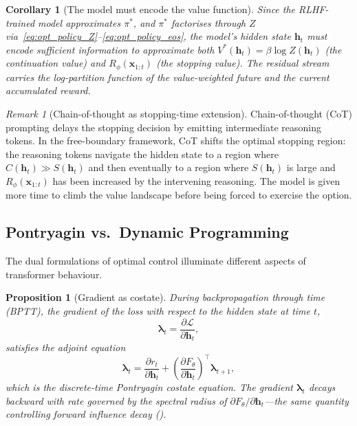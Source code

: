 \documentclass[11pt,a4paper]{article}
\theoremstyle{plain}
\newtheorem{proposition}[theorem]{Proposition}
\newtheorem{corollary}[theorem]{Corollary}
\theoremstyle{definition}
\theoremstyle{remark}
\newtheorem{remark}[theorem]{Remark}
\newcommand{\cL}{\mathcal{L}}
\begin{document}
\begin{corollary}[The model must encode the value function]\label{cor:must_encode}
Since the RLHF-trained model approximates $\pi^*$, and $\pi^*$ factorises
through $Z$ via~\eqref{eq:opt_policy_Z}--\eqref{eq:opt_policy_eos}, the
model's hidden state $\bm{h}_t$ must encode sufficient information to
approximate both $V^*(\bm{h}_t) = \beta \log Z(\bm{h}_t)$ (the
continuation value) and $R_\phi(\bm{x}_{1:t})$ (the stopping value).
The residual stream carries the log-partition function of the
value-weighted future \emph{and} the current accumulated reward.
\end{corollary}

\begin{remark}[Chain-of-thought as stopping-time extension]
Chain-of-thought (CoT) prompting delays the stopping decision by emitting
intermediate reasoning tokens. In the free-boundary framework, CoT
shifts the optimal stopping region: the reasoning tokens navigate the
hidden state to a region where $C(\bm{h}_t) \gg S(\bm{h}_t)$ and then
eventually to a region where $S(\bm{h}_t)$ is large and
$R_\phi(\bm{x}_{1:t})$ has been increased by the intervening reasoning.
The model is given more time to climb the value landscape before being
forced to exercise the option.
\end{remark}

\subsection{Pontryagin vs.\ Dynamic Programming}

The dual formulations of optimal control illuminate different aspects of
transformer behaviour.

\begin{proposition}[Gradient as costate]
During backpropagation through time (BPTT), the gradient of the loss with
respect to the hidden state at time $t$,
\[
  \bm{\lambda}_t = \frac{\partial \cL}{\partial \bm{h}_t},
\]
satisfies the adjoint equation
\begin{equation}\label{eq:adjoint}
  \bm{\lambda}_t
  = \frac{\partial r_t}{\partial \bm{h}_t}
    + \left(\frac{\partial F_\theta}{\partial \bm{h}_t}\right)^\top \bm{\lambda}_{t+1},
\end{equation}
which is the discrete-time Pontryagin costate equation. The gradient
$\bm{\lambda}_t$ decays backward with rate governed by the spectral radius of
$\partial F_\theta / \partial \bm{h}_t$---the same quantity controlling forward
influence decay ().
\end{proposition}
\end{document}
